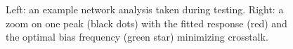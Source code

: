 \begin{figure}[htbp]
\begin{center}
\caption{Left: an example network analysis taken during testing.
Right: a zoom on one peak (black dots) with the fitted response (red) and the optimal bias frequency (green star) minimizing crosstalk.}
\label{fig:network_analysis}
\end{center}
\end{figure}



